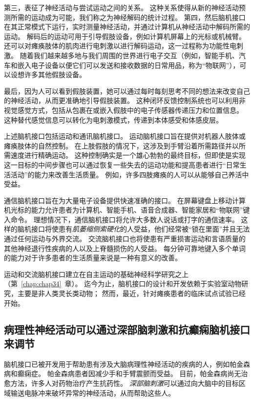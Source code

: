 第三，表征了神经活动与尝试运动之间的关系。
这种关系使得从新的神经活动预测所需的运动成为可能，我们称之为神经解码的统计过程。
第四，然后脑机接口在其正常模式下运行，实时测量神经活动，并通过计算机从神经活动中解码所需的运动。
解码后的运动可用于引导假肢设备，例如计算机屏幕上的光标或机械臂。
还可以对瘫痪肢体的肌肉进行电刺激以进行解码运动，这一过程称为功能性电刺激。
随着我们越来越多地与我们周围的世界进行电子交互（例如，智能手机、汽车和嵌入电子设备以便它们可以发送和接收数据的日常用品，称为“物联网”），可以设想许多其他假肢设备。


最后，因为人可以看到假肢装置，她可以通过每时每刻思考不同的想法来改变自己的神经活动，从而更准确地引导假肢装置。
这种闭环反馈控制系统也可以利用非视觉感觉方式，包括从包裹在或嵌入假肢中的电子传感器传递压力和位置信息。
这种替代感觉信息可以转化为电刺激模式，传递到本体感受和体感皮层。


上述脑机接口包括运动和通讯脑机接口。
运动脑机接口旨在提供对机器人肢体或瘫痪肢体的自然控制。
在上肢假肢的情况下，这涉及到手臂沿着所需路径并以所需速度进行精确运动。
这种控制确实是一个雄心勃勃的最终目标，但即使是实现这一目标的中间步骤也可以通过恢复一些失去的运动功能和提高患者进行“日常生活活动”的能力来改善生活质量。
例如，许多四肢瘫痪的人可以从能够自己养活中受益。


通信脑机接口旨在为大量电子设备提供快速准确的接口。 
在屏幕键盘上移动计算机光标的能力允许患者为计算机、智能手机、语音合成器、智能家居和“物联网”键入命令。 
理想情况下，通信脑机接口将允许大多数人说话或打字的通信速率。
这样的脑机接口将使患有\textit{肌萎缩侧索硬化}的人受益，他们经常被“锁在里面”并且无法通过任何运动与外界交流。
交流脑机接口也将使患有严重损害运动和言语质量的其他神经退行性疾病的人以及上脊髓损伤的人受益。
每分钟可靠地键入多个单词的能力对于许多患者的生活质量来说是一种有意义的改善。


运动和交流脑机接口建立在自主运动的基础神经科学研究之上（第~\ref{chap:chap34}~章）。 
迄今为止，脑机接口的设计和开发依赖于实验室动物研究，主要是非人类灵长类动物；
然而，最近，针对瘫痪患者的临床试点试验已经开始。



\subsection{病理性神经活动可以通过深部脑刺激和抗癫痫脑机接口来调节}

脑机接口已被开发用于帮助患有涉及大脑病理性神经活动的疾病的人，例如帕金森病和癫痫症。
帕金森病患者因减少手和手臂震颤而受益。 
目前，帕金森病尚无治愈方法，许多人对药物治疗产生抗药性。
\textit{深部脑刺激}可以通过向大脑中的目标区域输送电脉冲来破坏异常的神经活动，从而帮助这些人。


